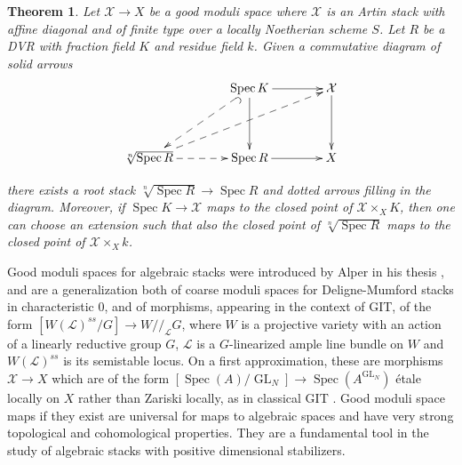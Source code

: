 \documentclass{amsart}
\newtheorem{theorem}{Theorem}[section]
\theoremstyle{definition}
\newcommand{\cX}{\mathcal{X}}
\newcommand{\cL}{\mathcal{L}}
\newcommand{\cR}{\mathcal{R}}
\DeclareMathOperator{\GL}{GL}
\DeclareMathOperator{\Spec}{Spec}
\newcommand{\spec}{\operatorname{Spec}}
\begin{document}
\begin{theorem}\label{thm:main}
    Let $\cX\to X$ be a good moduli space where $\cX$ is an Artin stack with affine diagonal and of finite type over a locally Noetherian scheme $S$. Let $R$ be a DVR with fraction field $K$ and residue field $k$. Given a commutative diagram of solid arrows
    \[
    \xymatrix@R=4em@C=4em{
        &\spec K \ar@{^{(}-->}[dl]\ar[d]\ar[r] & \cX\ar[d]\\
        \sqrt[n]{\Spec R} \ar@{-->}[r] \ar@{-->}[rru]&\spec R\ar[r] & X
    }
    \]
\begin{comment}

    \[
    \xymatrix{
        \spec K\ar@{-->}[r]\ar[dr]\ar@/^1.2pc/[rr] & \cR\ar@{-->}[d]\ar@{-->}[r]\ar@{-->}[d] & \cX\ar[d]\\
        &\spec R\ar[r] & X
    }
    \]
\end{comment}
    there exists a root stack $\sqrt[n]{\spec R} \to\spec R$ and dotted arrows filling in the diagram. Moreover, if $\spec K\to \cX$ maps to the closed point of $\cX\times_X K$, then one can choose an extension such that also the closed point of $\sqrt[n]{\spec R}$ maps to the closed point of $\cX\times_X k$.
\end{theorem}

Good moduli spaces for algebraic stacks were introduced by Alper in his thesis \cite{Alper}, and are a generalization both of coarse moduli spaces for Deligne-Mumford stacks in characteristic $0$, and of morphisms, appearing in the context of GIT, of the form $[W(\cL)^{ss}/G]\to W/\!\!/_\cL G$, where $W$ is a projective variety with an action of a linearly reductive group $G$, $\cL$ is a $G$-linearized ample line bundle on $W$ and $W(\cL)^{ss}$ is its semistable locus. On a first approximation, these are morphisms $\cX\to X$ which are of the form $[\spec(A)/\GL_N]\to \spec(A^{\GL_N})$ \'etale locally on $X$ rather than Zariski locally, as in classical GIT \cite[Theorem 6.1]{AHRetalelocal}. Good moduli space maps if they exist are universal for maps to algebraic spaces and have very strong topological and cohomological properties. They are a fundamental tool in the study of algebraic stacks with positive dimensional stabilizers. 
\end{document}
